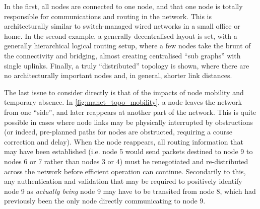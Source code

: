 In the first, all nodes are connected to one node, and that one node is totally responsible for communications and routing in the network.
This is architecturally similar to switch-managed wired networks in a small office or home.
In the second example, a generally decentralised layout is set, with a generally hierarchical logical routing setup, where a few nodes take the brunt of the connectivity and bridging, almost creating centralised ``sub graphs'' with single uplinks.
Finally, a truly ``distributed'' topology is shown, where there are no architecturally important nodes and, in general, shorter link distances. 

The last issue to consider directly is that of the impacts of node mobility and temporary absence.
In \autoref{fig:manet_topo_mobility}, a node leaves the network from one ``side'', and later reappears at another part of the network.
This is quite possible in cases where node links may be physically interrupted by obstructions (or indeed, pre-planned paths for nodes are obstructed, requiring a course correction and delay).
When the node reappears, all routing information that may have been established (i.e. node 5 would send packets destined to node 9 to nodes 6 or 7 rather than nodes 3 or 4) must be renegotiated and re-distributed across the network before efficient operation can continue.
Secondarily to this, any authentication and validation that may be required to positively identify node 9 as \emph{actually being} node 9 may have to be transited from node 8, which had previously been the only node directly communicating to node 9.

